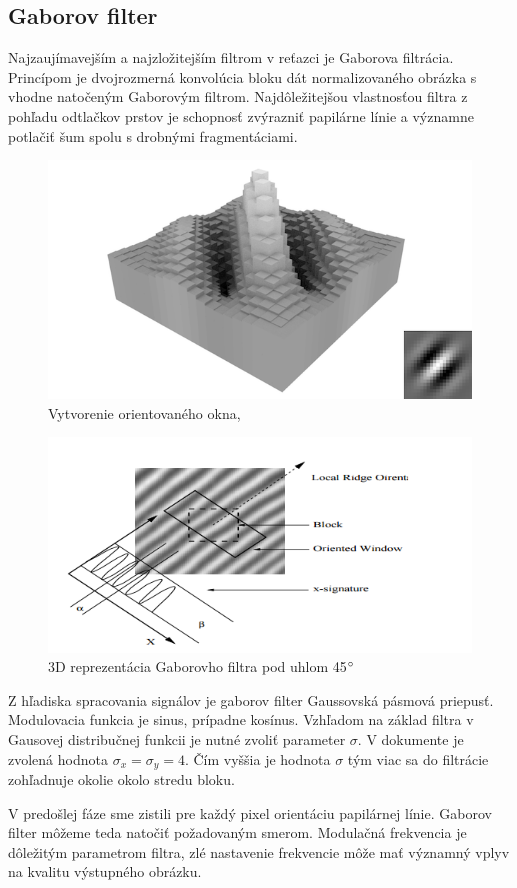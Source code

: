 \documentclass[11pt,a4paper]{article}
\begin{document}
\subsection*{Gaborov filter}
Najzaujímavejším a najzložitejším filtrom v reťazci je Gaborova filtrácia. Princípom je dvojrozmerná konvolúcia bloku dát normalizovaného obrázka s vhodne natočeným Gaborovým filtrom. Najdôležitejšou vlastnosťou filtra z pohľadu odtlačkov prstov je schopnosť zvýrazniť papilárne línie a významne potlačiť šum spolu s drobnými fragmentáciami. 

\begin{figure}[h!]
	\centering
	\includegraphics[width=.4\linewidth]{images/gabor_kernel}
	\caption{Vytvorenie orientovaného okna, \cite{hong}}
	\label{fig:7}
\end{figure}

\begin{figure}[h!]
	\centering
	\includegraphics[width=.7\linewidth]{images/Screenshot_11}
	\caption{3D reprezentácia Gaborovho filtra pod uhlom 45$\degree$}
	\label{fig:6}
\end{figure}

Z hľadiska spracovania signálov je gaborov filter Gaussovská pásmová priepusť. Modulovacia funkcia je sinus, prípadne kosínus. Vzhľadom na základ filtra v Gausovej distribučnej funkcii je nutné zvoliť parameter $\sigma$. V dokumente \cite{hong} je zvolená hodnota $\sigma_x = \sigma_y = 4$. Čím vyššia je hodnota $\sigma$ tým viac sa do filtrácie zohľadnuje okolie okolo stredu bloku.


V predošlej fáze sme zistili pre každý pixel orientáciu papilárnej línie. Gaborov filter môžeme teda natočiť požadovaným smerom. Modulačná frekvencia je dôležitým parametrom filtra, zlé nastavenie frekvencie môže mať významný vplyv na kvalitu výstupného obrázku. 
\end{document}
